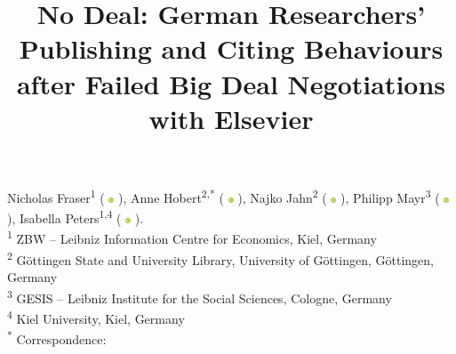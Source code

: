 \title{\vspace{-2em}No Deal: German Researchers' Publishing and Citing Behaviours after Failed Big Deal Negotiations with Elsevier\vspace{-3em}}
\date{}

\newcommand{\orcid}{%
  \begingroup\normalfont
  \includegraphics[height=6px]{./assets/orcid_logo.png}%
  \endgroup
}
Nicholas Fraser\textsuperscript{1} (\orcid{} \href{https://orcid.org/0000-0002-7582-6339}{\color{black}{0000-0002-7582-6339}}), Anne Hobert\textsuperscript{2,*} (\orcid{} \href{https://orcid.org/0000-0003-2429-2995}{\color{black}{0000-0003-2429-2995}}), Najko Jahn\textsuperscript{2} (\orcid{} \href{https://orcid.org/0000-0001-5105-1463}{\color{black}{0000-0001-5105-1463}}), Philipp Mayr\textsuperscript{3} (\orcid{} \href{https://orcid.org/0000-0002-6656-1658}{\color{black}{0000-0002-6656-1658}}), Isabella Peters\textsuperscript{1,4} (\orcid{} \href{https://orcid.org/0000-0001-5840-0806}{\color{black}{0000-0001-5840-0806}}). \\

\textsuperscript{1} ZBW -- Leibniz Information Centre for Economics, Kiel, Germany \\
\textsuperscript{2} Göttingen State and University Library, University of Göttingen, Göttingen, Germany \\
\textsuperscript{3} GESIS -- Leibniz Institute for the Social Sciences, Cologne, Germany \\
\textsuperscript{4} Kiel University, Kiel, Germany \\

\textsuperscript{*} Correspondence: \href{mailto:hobert@sub.uni-goettingen.de}{\color{black}{hobert@sub.uni-goettingen.de}} 